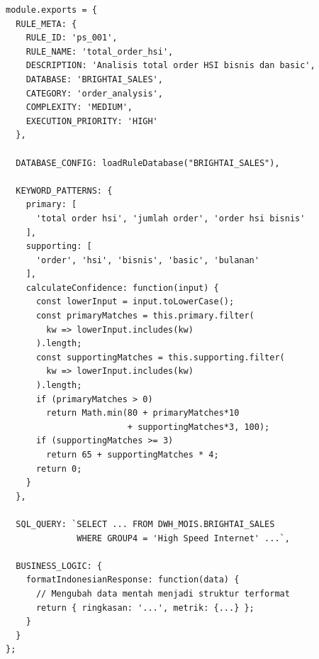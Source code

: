 \begin{lstlisting}[caption={Contoh Struktur Definisi Aturan Analitik}, label={lst:rule-definition}, style=jsstyle]
module.exports = {
  RULE_META: {
    RULE_ID: 'ps_001',
    RULE_NAME: 'total_order_hsi',
    DESCRIPTION: 'Analisis total order HSI bisnis dan basic',
    DATABASE: 'BRIGHTAI_SALES',
    CATEGORY: 'order_analysis',
    COMPLEXITY: 'MEDIUM',
    EXECUTION_PRIORITY: 'HIGH'
  },

  DATABASE_CONFIG: loadRuleDatabase("BRIGHTAI_SALES"),

  KEYWORD_PATTERNS: {
    primary: [
      'total order hsi', 'jumlah order', 'order hsi bisnis'
    ],
    supporting: [
      'order', 'hsi', 'bisnis', 'basic', 'bulanan'
    ],
    calculateConfidence: function(input) {
      const lowerInput = input.toLowerCase();
      const primaryMatches = this.primary.filter(
        kw => lowerInput.includes(kw)
      ).length;
      const supportingMatches = this.supporting.filter(
        kw => lowerInput.includes(kw)
      ).length;
      if (primaryMatches > 0)
        return Math.min(80 + primaryMatches*10
                        + supportingMatches*3, 100);
      if (supportingMatches >= 3)
        return 65 + supportingMatches * 4;
      return 0;
    }
  },

  SQL_QUERY: `SELECT ... FROM DWH_MOIS.BRIGHTAI_SALES
              WHERE GROUP4 = 'High Speed Internet' ...`,

  BUSINESS_LOGIC: {
    formatIndonesianResponse: function(data) {
      // Mengubah data mentah menjadi struktur terformat
      return { ringkasan: '...', metrik: {...} };
    }
  }
};
\end{lstlisting}
